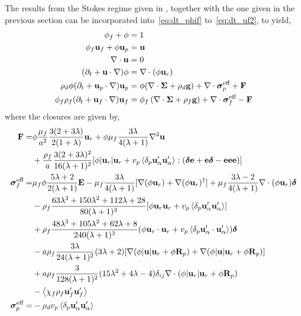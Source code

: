 The results from the Stokes regime given in \citet{fintzi2024averaged}, together with the one given in the previous section can be incorporated into~\ref{eq:dt_phif} to~\ref{eq:dt_uf2}, to yield, 
\begin{align}
    \label{eq:firstSys}
    \phi_f + \phi &= 1\\
    \phi_f\textbf{u}_f + 
    \phi\textbf{u}_p&=\textbf{u}\\
    \div \textbf{u} &= 0\\
    (\pddt + \textbf{u} \cdot \grad)\phi
    &=
    \div (\phi \textbf{u}_r)\\
    \rho_d \phi (\pddt + \textbf{u}_p \cdot \grad)\textbf{u}_p
    &=
    \phi(\div \bm\Sigma
    + \rho_d  \textbf{g})
    + \div \bm\sigma_p^\text{eff}
    + \textbf{F}
    \\
    \phi_f \rho_f(\pddt + \textbf{u}_f  \cdot \grad) \textbf{u}_f
    &= \phi_f 
    \left(\div \bm\Sigma
    + \rho_f \textbf{g}\right)
    + \div \bm\sigma_f^\text{eff}
    -\textbf{F}
    \label{eq:lastSys}
\end{align}
where the closures are given by,
\begin{align}
    \textbf{F}=&
    \phi
    \frac{\mu_f}{a^2}
    \frac{3(2+3\lambda)}{2(1+\lambda)}\textbf{u}_r
    + \phi\mu_f  \frac{3\lambda}{4(\lambda +1)} \grad^2 \textbf{u}\\
    &+ \frac{\rho_f}{a} \frac{3 (2+3\lambda)^2}{16 (\lambda+1)^2}
    [\phi |\textbf{u}_r| \textbf{u}_r+ v_p \pavg{ \textbf{u}_\alpha'\textbf{u}_\alpha'}:
    (\bm\delta \textbf{e} +\textbf{e} \bm\delta  - \textbf{eee})]
    \\
    \bm\sigma_f^\text{eff}
    =&
     \mu_f \phi \frac{5\lambda +2}{2(\lambda+1)} \textbf{E}
    - \mu_f \frac{3\lambda}{4(\lambda+1)} [
    \grad(\phi \textbf{u}_r)
    + \grad(\phi \textbf{u}_r)^\dagger]
    + \mu_f \frac{3\lambda - 2}{4(\lambda+1)} \div(\phi \textbf{u}_r)  \bm\delta\nonumber\\
    &- \rho_f  \frac{63 \lambda^{3} + 150 \lambda^{2} + 112 \lambda + 28}{80 (\lambda+1)^{3}} [\phi \textbf{u}_r \textbf{u}_r + v_p \pavg{\textbf{u}_\alpha'\textbf{u}_\alpha'} ] \\ 
    &+ \rho_f   \frac{48\lambda^3 + 105 \lambda^2 + 62\lambda + 8}{240 (\lambda+1)^3} (\phi \textbf{u}_r\cdot \textbf{u}_r+ v_p \pavg{\textbf{u}_\alpha'\cdot \textbf{u}_\alpha'}) \bm\delta\\
    &- a\rho_f\frac{ 3\lambda}{24(\lambda+1)^2} ( 3\lambda+2) [\grad (\phi|\textbf{u}|\textbf{u}_r+\phi\textbf{R}_p) + \grad (\phi|\textbf{u}|\textbf{u}_r+\phi\textbf{R}_p)]\\
    &+ a\rho_f\frac{3}{128(\lambda+1)^2} ( 15\lambda^2+4\lambda -4) \delta_{ij} \div(\phi|\textbf{u}_r|\textbf{u}_r+ \phi\textbf{R}_p)\\
    &-\avg{\chi_f\rho_f \textbf{u}_f'\textbf{u}_f'}
    \label{eq:sigma_feffff}\\
    \bm\sigma_p^\text{eff}
    =&-\rho_d v_p\pavg{\textbf{u}_\alpha'\textbf{u}_\alpha'}
\end{align}
